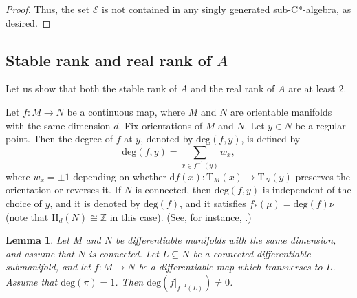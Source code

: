 \documentclass[12pt, oneside, psamsfonts]{amsart}
\newtheorem{lem}[thm]{Lemma}
\theoremstyle{definition}
\theoremstyle{remark}
\numberwithin{equation}{section}
\newcommand{\Int}{\mathbb Z}
\begin{document}
\begin{proof}
Thus, the set $\mathcal E$ is not contained in any singly generated sub-C*-algebra, as desired.
\end{proof}



\subsection{Stable rank and real rank of $A$}

Let us show that both the stable rank of $A$ and the real rank of $A$ are at least $2$.

Let $f: M \to N$ be a continuous map, where $M$ and $N$ are orientable manifolds with the same dimension $d$.  Fix orientations of $M$ and $N$. Let $y \in N$ be a regular point. Then the degree of $f$ at $y$, denoted by $\mathrm{deg}(f, y)$, is defined by $$\mathrm{deg}(f, y) = \sum_{x \in f^{-1}(y)} w_x,$$ where $w_x = \pm 1$ depending on whether $\mathrm{d}f(x): \mathrm{T}_M(x) \to \mathrm{T}_N(y)$ preserves the orientation or reverses it. If $N$ is connected, then $\mathrm{deg}(f, y)$ is independent of the choice of $y$, and it is denoted by $\mathrm{deg}(f)$, and it satisfies $f_*(\mu) = \mathrm{deg}(f) \nu$ (note that $\mathrm{H}_d(N) \cong \Int$ in this case). (See, for instance, \cite{Hirsch-GTM}.)




\begin{lem}\label{nenzero-dc-lem}
Let $M$ and $N$ be differentiable manifolds with the same dimension, and assume that $N$ is connected. Let $L \subseteq N$ be a connected differentiable submanifold, and let $f: M \to N$ be a differentiable map which transverses to $L$. Assume that $\mathrm{deg}(\pi) = 1$. Then $\mathrm{deg}(f |_{f^{-1}(L)}) \neq 0$.
\end{lem}
\end{document}

